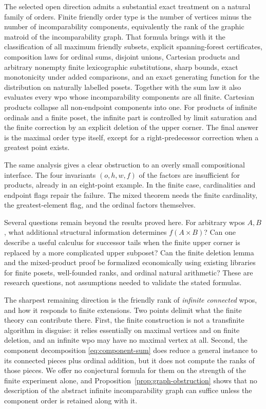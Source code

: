 \documentclass[11pt,letterpaper]{article}
\theoremstyle{definition}
\theoremstyle{remark}
\begin{document}
The selected open direction admits a substantial exact treatment on a
natural family of orders. Finite friendly order type is the number of
vertices minus the number of incomparability components, equivalently the
rank of the graphic matroid of the incomparability graph. That formula
brings with it the classification of all maximum friendly subsets, explicit
spanning-forest certificates, composition laws for ordinal sums, disjoint
unions, Cartesian products and arbitrary nonempty finite lexicographic
substitutions, sharp bounds, exact monotonicity under added comparisons, and
an exact generating function for the distribution on naturally labelled
posets. Together with the sum law it also evaluates every wpo whose
incomparability components are all finite. Cartesian
products collapse all non-endpoint components into one. For products of
infinite ordinals and a finite poset, the infinite part is controlled by
limit saturation and the finite correction by an explicit deletion of
the upper corner. The final answer is the maximal order type itself,
except for a right-predecessor correction when a greatest point exists.

The same analysis gives a clear obstruction to an overly small
compositional interface. The four invariants $(o,h,w,f)$ of the factors
are insufficient for products, already in an eight-point example. In the
finite case, cardinalities and endpoint flags repair the failure. The
mixed theorem needs the finite cardinality, the greatest-element flag,
and the ordinal factors themselves.

Several questions remain beyond the results proved here. For arbitrary
wpos $A,B$, what additional structural information determines
$f(A\times B)$? Can one describe a useful calculus for successor tails
when the finite upper corner is replaced by a more complicated upper
subposet? Can the finite deletion lemma and the mixed-product proof be
formalized economically using existing libraries for finite posets,
well-founded ranks, and ordinal natural arithmetic? These are research
questions, not assumptions needed to validate the stated formulas.

The sharpest remaining direction is the friendly rank of \emph{infinite
connected} wpos, and how it responds to finite extensions. Two points
delimit what the finite theory can contribute there. First, the finite
construction is not a transfinite algorithm in disguise: it relies
essentially on maximal vertices and on finite deletion, and an infinite wpo
may have no maximal vertex at all. Second, the component decomposition
\eqref{eq:component-sum} does reduce a general instance to its connected
pieces plus ordinal addition, but it does not compute the ranks of those
pieces. We offer no conjectural formula for them on the strength of the
finite experiment alone, and
Proposition~\ref{prop:graph-obstruction} shows that no description of the
abstract infinite incomparability graph can suffice unless the component
order is retained along with it.
\end{document}
